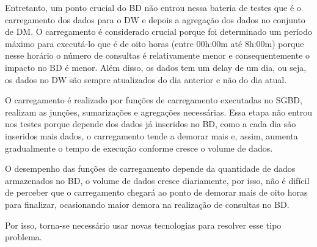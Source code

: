 Entretanto, um ponto crucial do BD não entrou nessa bateria de testes que é o
carregamento dos dados para o DW e depois a agregação dos dados no conjunto de
DM. O carregamento é considerado crucial porque foi determinado um período máximo
para executá-lo que é de oito horas (entre 00h:00m até 8h:00m) porque nesse horário
o número de consultas é relativamente menor e consequentemente o impacto no BD é
menor. Além disso, os dados tem um delay de um dia, ou seja, os dados no DW são
sempre atualizados do dia anterior e não do dia atual. 

O carregamento é realizado por funções de carregamento executadas no SGBD,
realizam as junções, sumarizações e agregações necessárias. Essa etapa não
entrou nos testes porque depende dos dados já inseridos no BD, como a cada dia
são inseridos mais dados, o carregamento tende a demorar mais e, assim, aumenta
gradualmente o tempo de execução conforme cresce o volume de dados.

O desempenho das funções de carregamento depende da quantidade de dados armazenados
no BD, o volume de dados cresce diariamente, por isso, não é difícil de perceber
que o carregamento chegará ao ponto de demorar mais de oito horas para finalizar,
ocasionando maior demora na realização de consultas no BD.

Por isso, torna-se necessário usar novas tecnologias para resolver esse tipo
problema.